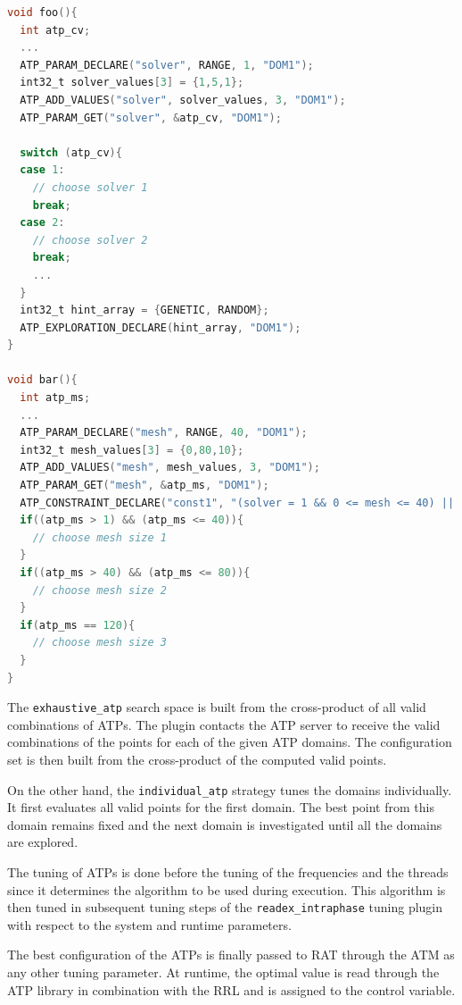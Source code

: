 \begin{lstlisting}[language=C,xleftmargin=3em,frame=none,title=\phantom{xxx},caption=ATP constraint and exploration declaration with the ATP library.,label=lbl:atp_example]
void foo(){
  int atp_cv;
  ...
  ATP_PARAM_DECLARE("solver", RANGE, 1, "DOM1");
  int32_t solver_values[3] = {1,5,1};
  ATP_ADD_VALUES("solver", solver_values, 3, "DOM1");
  ATP_PARAM_GET("solver", &atp_cv, "DOM1");
	
  switch (atp_cv){
  case 1:
    // choose solver 1
    break;
  case 2:
    // choose solver 2
    break;
    ...
  }
  int32_t hint_array = {GENETIC, RANDOM};
  ATP_EXPLORATION_DECLARE(hint_array, "DOM1");
}
	
void bar(){
  int atp_ms;
  ...
  ATP_PARAM_DECLARE("mesh", RANGE, 40, "DOM1");
  int32_t mesh_values[3] = {0,80,10};
  ATP_ADD_VALUES("mesh", mesh_values, 3, "DOM1");
  ATP_PARAM_GET("mesh", &atp_ms, "DOM1");
  ATP_CONSTRAINT_DECLARE("const1", "(solver = 1 && 0 <= mesh <= 40) || (solver = 2 && 40 <= mesh <= 80) || (solver > 2 && mesh = 120)", "DOM1");
  if((atp_ms > 1) && (atp_ms <= 40)){
    // choose mesh size 1
  }
  if((atp_ms > 40) && (atp_ms <= 80)){
    // choose mesh size 2
  }
  if(atp_ms == 120){
    // choose mesh size 3
  }
}
\end{lstlisting} 
The \texttt{exhaustive\_atp} search space is built from the cross-product of all valid combinations of ATPs. The plugin contacts the ATP server to receive the valid combinations of the points for each of the given ATP domains. The configuration set is then built from the cross-product of the computed valid points. 

On the other hand, the \texttt{individual\_atp} strategy tunes the domains individually. It first evaluates all valid points for the first domain. The best point from this domain remains fixed and the next domain is investigated until all the domains are explored.

The tuning of ATPs is done before the tuning of the frequencies and the threads since it determines the algorithm to be used during execution. This algorithm is then tuned in subsequent tuning steps of the \texttt{readex\_intraphase} tuning plugin with respect to the system and runtime parameters. 

The best configuration of the ATPs is finally passed to RAT through the ATM as any other tuning parameter. At runtime, the optimal value is read through the ATP library in combination with the RRL and is assigned to the control variable.
